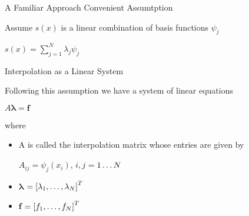 \documentclass[12pt,t]{beamer}
\newcommand{\bi}{\begin{itemize}}
\newcommand{\ei}{\end{itemize}}
\newcommand{\subt}[1]{{\footnotesize \color{subtitle} {#1}}}
\begin{document}
\begin{frame}{A Familiar Approach}
\subt{Convenient Assumtption}

Assume $s(x)$ is a linear combination of \subt{basis functions} $\psi_j$
\begin{center}
$s(x)=\sum_{j=1}^N \lambda_j \psi_j$
\end{center}

\subt{Interpolation as a Linear System}

Following this assumption we have a system of linear equations
\begin{center}
$A\boldsymbol{\lambda}=\boldsymbol{f}$
\end{center}
 where
 \bi
\item[A] is called the \subt{interpolation matrix} whose entries are given by\\
\begin{center}
$A_{ij}=\psi_j(x_i)$, $i,j= 1 \mathellipsis N$
\end{center}
\item[$\boldsymbol{\lambda}$] $=\left[ \lambda_1, \mathellipsis, \lambda_N \right]^T$
\item[$\boldsymbol{f}$] $=\left[ f_1, \mathellipsis, f_N \right]^T$
\ei

\note{}
\end{frame}
\end{document}

